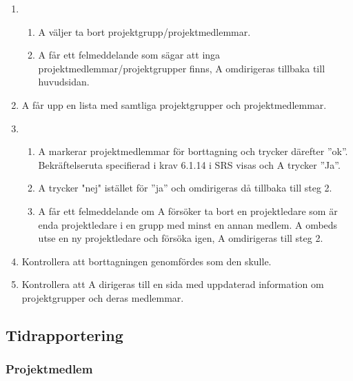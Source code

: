 \documentclass[a4paper]{article}
\begin{document}
\begin{ST}
\begin{enumerate}
\item 
\begin{enumerate}
\item A väljer ta bort projektgrupp/projektmedlemmar.
\item A får ett felmeddelande som sägar att inga projektmedlemmar/projektgrupper finns, A omdirigeras tillbaka till huvudsidan.
\end{enumerate}
\item A får upp en lista med samtliga projektgrupper och projektmedlemmar.
\item 
\begin{enumerate}
\item A markerar projektmedlemmar för borttagning och trycker därefter ''ok''. Bekräftelseruta specifierad i krav 6.1.14 i SRS visas och A trycker ''Ja''.
\item A trycker "nej" istället för ''ja'' och omdirigeras då tillbaka till steg 2.
\item A får ett felmeddelande om A försöker ta bort en projektledare som är enda projektledare i en grupp med minst en annan medlem. A ombeds utse en ny projektledare och försöka igen, A omdirigeras till steg 2.
\end{enumerate}
\item Kontrollera att borttagningen genomfördes som den skulle.
\item Kontrollera att A dirigeras till en sida med uppdaterad information om projektgrupper och deras medlemmar.
\end{enumerate}

\end{ST}







\subsection{Tidrapportering}
\subsubsection{Projektmedlem}
\end{document}
